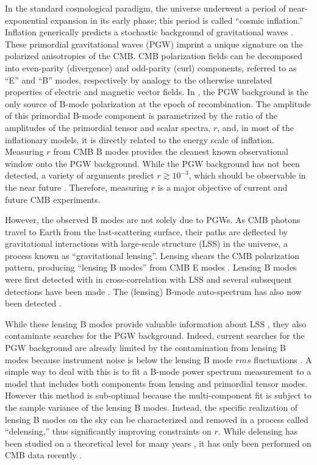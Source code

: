 In the standard cosmological paradigm, the universe underwent a period of near-exponential expansion in its early phase;
this period is called ``cosmic inflation.''
Inflation generically predicts a stochastic background of gravitational waves \citep[see e.g.][for a review]{kamionkowski15}.
These primordial gravitational waves (PGW) imprint a unique signature on the polarized anisotropies of the CMB.
CMB polarization fields can be decomposed into even-parity (divergence) and odd-parity (curl) components, referred to as ``E'' and ``B'' modes, respectively by analogy to the otherwise unrelated properties of electric and magnetic vector fields.
In \LCDM, the PGW background is the only source of B-mode polarization at the epoch of recombination.
The amplitude of this primordial B-mode component is parametrized by the ratio of the amplitudes of the primordial tensor and scalar spectra, $r$, and, in most of the inflationary models, it is directly related to the energy scale of inflation.
Measuring $r$ from CMB B modes provides the cleanest known observational window onto the PGW background.
While the PGW background has not been detected, a variety of arguments predict $r \gtrsim 10^{-3}$, which should be observable in the near future \citep{kamionkowski15}.
Therefore, measuring $r$ is a major objective of current and future CMB experiments.

However, the observed B modes are not solely due to PGWs.
As CMB photons travel to Earth from the last-scattering surface, their paths are deflected by gravitational interactions with large-scale structure (LSS) in the universe, a process known as ``gravitational lensing''.
Lensing shears the CMB polarization pattern, producing ``lensing B modes'' from CMB E modes \citep{zaldarriaga98}.
Lensing B modes were first detected with \sptpol in cross-correlation with LSS \citep{hanson13} and several subsequent detections have been made \citep{polarbear2014c,vanengelen14b,planck2015XV}.
The (lensing) B-mode auto-spectrum has also now been detected \citep{polarbear2014b,bicep2a,keisler15}.

While these lensing B modes provide valuable information about LSS \citep[e.g.][]{smith08}, they also contaminate searches for the PGW background.
Indeed, current searches for the PGW background are already limited by the contamination from lensing B modes because instrument noise is below the lensing B mode $rms$ fluctuations \citep{bk14}.
A simple way to deal with this is to fit a B-mode power spectrum measurement to a model that includes both components from lensing and primordial tensor modes.
However this method is sub-optimal because the multi-component fit is subject to the sample variance of the lensing B modes.
Instead, the specific realization of lensing B modes on the sky can be characterized and removed in a process called ``delensing,'' thus significantly improving constraints on $r$.
While delensing has been studied on a theoretical level for many years \citep{simard:2015,sherwin15,smith:2012},
it has only been performed on CMB data recently \citep{larsen:2016, carron17}.

